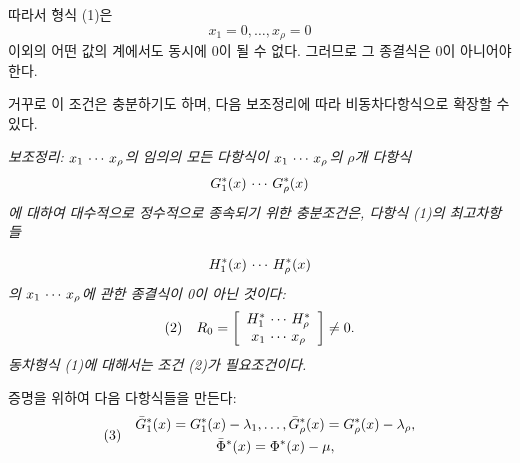 따라서 형식 (1)은
\[
x_1=0,\ldots,x_\rho=0
\]
이외의 어떤 값의 계에서도 동시에 0이 될 수 없다. 그러므로 그 종결식은 0이 아니어야 한다.

거꾸로 이 조건은 충분하기도 하며, 다음 보조정리에 따라 비동차다항식으로 확장할 수 있다.

\emph{보조정리: $x_1\,\cdots\, x_\rho$의 임의의 모든 다항식이 $x_1\,\cdots\, x_\rho$의 $\rho$개 다항식
\[
G_1^*(x)\,\cdots\, G_\rho^*(x)
\]
에 대하여 대수적으로 정수적으로 종속되기 위한 충분조건은, 다항식 (1)의 최고차항들}

\[
H_1^*(x)\,\cdots\, H_\rho^*(x)
\]
\emph{의 $x_1\,\cdots\, x_\rho$에 관한 종결식이 0이 아닌 것이다:}
\[
\begin{array}{@{}l@{\quad}c@{}}
(2)& \displaystyle R_0=\left[\begin{array}{c} H_1^*\rcdots H_\rho^*\\ x_1\rcdots x_\rho\end{array}\right]\ne0.
\end{array}
\]
\emph{동차형식 (1)에 대해서는 조건 (2)가 필요조건이다.}

증명을 위하여 다음 다항식들을 만든다:
\[
\begin{array}{@{}l@{\quad}c@{}}
(3)& \begin{gathered}
\bar G_1^*(x)=G_1^*(x)-\lambda_1,\ldots,\bar G_\rho^*(x)=G_\rho^*(x)-\lambda_\rho,\\
\bar\Phi^*(x)=\Phi^*(x)-\mu,
\end{gathered}
\end{array}
\]


